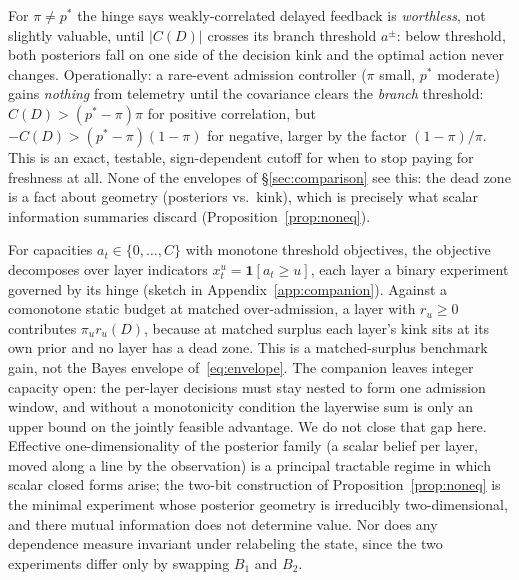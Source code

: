 \documentclass[acmsmall,screen,review,anonymous]{acmart}
\begin{document}
\begin{remark}
For $\pi\neq p^*$ the hinge says weakly-correlated delayed feedback is
\emph{worthless}, not slightly valuable, until $|C(D)|$ crosses
its branch threshold $a^{\pm}$: below threshold, both posteriors fall on one side of the decision
kink and the optimal action never changes. Operationally: a rare-event
admission controller ($\pi$ small, $p^*$ moderate) gains \emph{nothing}
from telemetry until the covariance clears the \emph{branch} threshold:
$C(D)>(p^*-\pi)\pi$ for positive correlation, but
$-C(D)>(p^*-\pi)(1-\pi)$ for negative, larger by the factor
$(1-\pi)/\pi$. This is an exact, testable, sign-dependent cutoff for
when to stop paying for freshness at all. None of the envelopes of \S\ref{sec:comparison} see
this: the dead zone is a fact about geometry (posteriors vs.\ kink), which
is precisely what scalar information summaries discard
(Proposition~\ref{prop:noneq}).
\end{remark}

\begin{remark}
For capacities $a_t\in\{0,\dots,C\}$ with monotone threshold objectives, the
objective decomposes over layer indicators $x^u_t=\mathbf 1[a_t\ge u]$, each
layer a binary experiment governed by its hinge (sketch in
Appendix~\ref{app:companion}). Against a comonotone static budget at matched
over-admission, a layer with $r_u\ge0$ contributes $\pi_u r_u(D)$, because
at matched surplus each layer's kink sits at its own prior and no layer has a
dead zone. This is a matched-surplus benchmark gain, not the Bayes envelope
of~\eqref{eq:envelope}. The companion leaves integer capacity open: the
per-layer decisions must stay nested to form one admission window, and
without a monotonicity condition the layerwise sum is only an upper bound
on the jointly feasible advantage. We do not close that gap here.
Effective one-dimensionality of the posterior family (a scalar belief
per layer, moved along a line by the observation) is a principal
tractable regime in which scalar closed forms arise; the
two-bit construction of Proposition~\ref{prop:noneq} is the minimal
experiment whose posterior geometry is irreducibly two-dimensional, and there
mutual information does not determine value. Nor does any dependence
measure invariant under relabeling the state, since the two experiments
differ only by swapping $B_1$ and $B_2$.
\end{remark}
\end{document}
